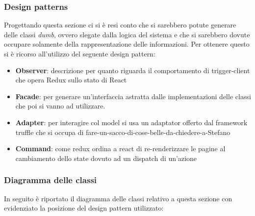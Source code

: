 \subsubsection{Design patterns}
Progettando questa sezione ci si è resi conto che si sarebbero potute generare delle classi \emph{dumb}, ovvero slegate dalla logica del sistema e che si sarebbero dovute occupare solamente della rappresentazione delle informazioni. Per ottenere questo si è ricorso all'utilizzo del seguente design pattern:
\begin{itemize}
	\item \textbf{Observer}: descrizione per quanto riguarda il comportamento di trigger-client che opera Redux sullo stato di React
	\item \textbf{Facade}: per generare un'interfaccia astratta dalle implementazioni delle classi che poi si vanno ad utilizzare.
	\item \textbf{Adapter}: per interagire col model si usa un adaptator offerto dal framework truffle che si occupa di fare-un-sacco-di-cose-belle-da-chiedere-a-Stefano
	\item \textbf{Command}: come redux ordina a react di re-renderizzare le pagine al cambiamento dello state dovuto ad un dispatch di un'azione
\end{itemize}

\subsubsection{Diagramma delle classi}
In seguito è riportato il diagramma delle classi relativo a questa sezione con evidenziato la posizione del design pattern utilizzato:


